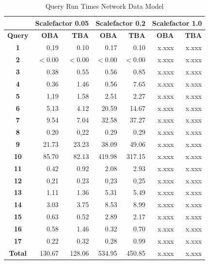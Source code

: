 \documentclass[a4paper]{article}
\begin{document}
\begin{table}
\begin{scriptsize}
\begin{center}
\begin{tabular}{|c|r|r|r|r|r|r|}
\hline
&\multicolumn{2}{c|}{\textbf{Scalefactor 0.05}}&\multicolumn{2}{c|}{\textbf{Scalefactor 0.2}}&\multicolumn{2}{c|}{\textbf{Scalefactor 1.0}}\\
\hline
\textbf{Query}&\textbf{OBA}&\textbf{TBA}&\textbf{OBA}&\textbf{TBA}&\textbf{OBA}&\textbf{TBA}\\
\hline
\textbf{1}&0,19&0.10&0.17&0.10&x.xxx&x.xxx\\
\hline
\textbf{2}&$<$0.00&$<$0.00&$<$0.00&$<$0.00&x.xxx&x.xxx\\
\hline
\textbf{3}&0.38&0.55&0.56&0.85&x.xxx&x.xxx\\
\hline
\textbf{4}&0.36&1.46&0.56&7.65&x.xxx&x.xxx\\
\hline
\textbf{5}&1,19&1.58&2.51&2.27&x.xxx&x.xxx\\
\hline
\textbf{6}&5.13&4.12&20.59&14.67&x.xxx&x.xxx\\
\hline
\textbf{7}&9.54&7.04&32.58&37.27&x.xxx&x.xxx\\
\hline
\textbf{8}&0.20&0,22&0.29&0.29&x.xxx&x.xxx\\
\hline
\textbf{9}&21.73&23.23&38.09&49.06&x.xxx&x.xxx\\
\hline
\textbf{10}&85.70&82.13&419.98&317.15&x.xxx&x.xxx\\
\hline
\textbf{11}&0.42&0.92&2.08&2.93&x.xxx&x.xxx\\
\hline
\textbf{12}&0,21&0.23&0,23&0,25&x.xxx&x.xxx\\
\hline
\textbf{13}&1.11&1.36&5.31&5.49&x.xxx&x.xxx\\
\hline
\textbf{14}&3.03&3.75&8.53&8.99&x.xxx&x.xxx\\
\hline
\textbf{15}&0.63&0.52&2.89&2.17&x.xxx&x.xxx\\
\hline
\textbf{16}&0.58&1.46&0.32&0.70&x.xxx&x.xxx\\
\hline
\textbf{17}&0.22&0.32&0.28&0.99&x.xxx&x.xxx\\
\hline
\textbf{Total}&130.67&128.06&534.95&450.85&x.xxx&x.xxx\\
\hline
\end{tabular}
\end{center}
\end{scriptsize}
\caption{Query Run Times Network Data Model}
\label{tab:rtnet}
\end{table}
\end{document}
